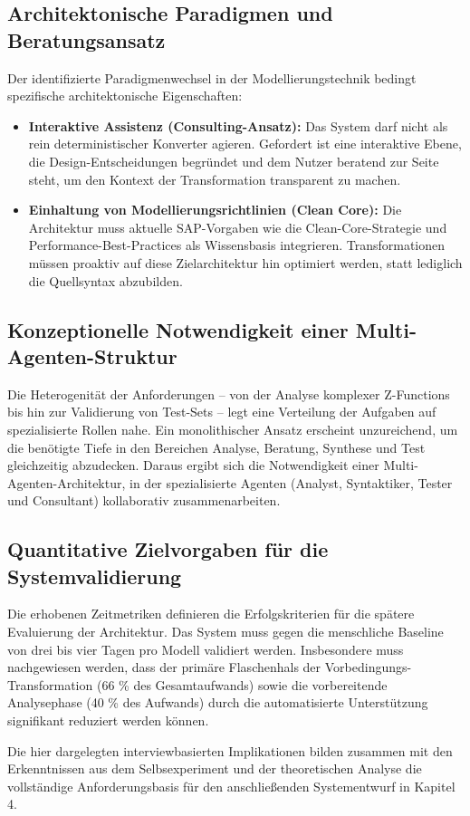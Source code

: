 \subsection{Architektonische Paradigmen und Beratungsansatz}
Der identifizierte Paradigmenwechsel in der Modellierungstechnik bedingt spezifische architektonische Eigenschaften:
\begin{itemize}
\item \textbf{Interaktive Assistenz (Consulting-Ansatz):} Das System darf nicht als rein deterministischer Konverter agieren. Gefordert ist eine interaktive Ebene, die Design-Entscheidungen begründet und dem Nutzer beratend zur Seite steht, um den Kontext der Transformation transparent zu machen.
\item \textbf{Einhaltung von Modellierungsrichtlinien (Clean Core):} Die Architektur muss aktuelle SAP-Vorgaben wie die Clean-Core-Strategie und Performance-Best-Practices als Wissensbasis integrieren. Transformationen müssen proaktiv auf diese Zielarchitektur hin optimiert werden, statt lediglich die Quellsyntax abzubilden.
\end{itemize}

\subsection{Konzeptionelle Notwendigkeit einer Multi-Agenten-Struktur}
Die Heterogenität der Anforderungen – von der Analyse komplexer Z-Functions bis hin zur Validierung von Test-Sets – legt eine Verteilung der Aufgaben auf spezialisierte Rollen nahe. Ein monolithischer Ansatz erscheint unzureichend, um die benötigte Tiefe in den Bereichen Analyse, Beratung, Synthese und Test gleichzeitig abzudecken. Daraus ergibt sich die Notwendigkeit einer Multi-Agenten-Architektur, in der spezialisierte Agenten (Analyst, Syntaktiker, Tester und Consultant) kollaborativ zusammenarbeiten.

\subsection{Quantitative Zielvorgaben für die Systemvalidierung}
Die erhobenen Zeitmetriken definieren die Erfolgskriterien für die spätere Evaluierung der Architektur. Das System muss gegen die menschliche Baseline von drei bis vier Tagen pro Modell validiert werden. Insbesondere muss nachgewiesen werden, dass der primäre Flaschenhals der Vorbedingungs-Transformation (66 \% des Gesamtaufwands) sowie die vorbereitende Analysephase (40 \% des Aufwands) durch die automatisierte Unterstützung signifikant reduziert werden können.

Die hier dargelegten interviewbasierten Implikationen bilden zusammen mit den Erkenntnissen aus dem Selbsexperiment und der theoretischen Analyse die vollständige Anforderungsbasis für den anschließenden Systementwurf in Kapitel 4.